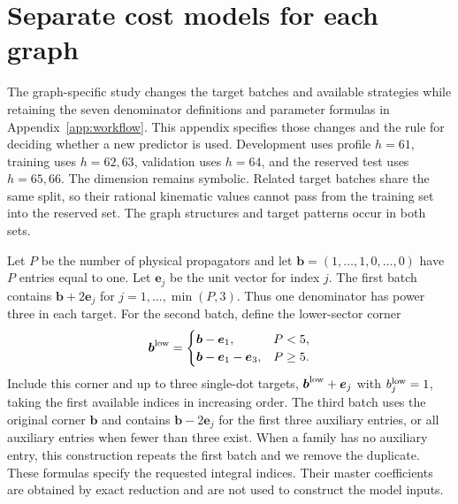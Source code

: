 \section{Separate cost models for each graph}
\label{app:type-specialists}
The graph-specific study changes the target batches and available strategies while retaining the seven denominator definitions and parameter formulas in Appendix~\ref{app:workflow}. This appendix specifies those changes and the rule for deciding whether a new predictor is used. Development uses profile $h=61$,
training uses $h=62,63$, validation uses $h=64$, and the reserved test uses
$h=65,66$. The dimension remains symbolic. Related target batches share
the same split, so their rational kinematic values cannot pass from the
training set into the reserved set. The graph structures and target
patterns occur in both sets.

Let $P$ be the number of physical propagators and let
$\boldsymbol b=(1,\ldots,1,0,\ldots,0)$ have $P$ entries equal to one.
Let $\boldsymbol e_j$ be the unit vector for index $j$. The first batch
contains $\boldsymbol b+2\boldsymbol e_j$ for
$j=1,\ldots,\min(P,3)$. Thus one denominator has power three in each target.
For the second batch, define the lower-sector corner
\begin{equation}
 \boldsymbol b^{\rm low}=
 \begin{cases}
 \boldsymbol b-\boldsymbol e_1,&P<5,\\
 \boldsymbol b-\boldsymbol e_1-\boldsymbol e_3,&P\geq5.
 \end{cases}
\end{equation}
Include this corner and up to three single-dot targets,
$\boldsymbol b^{\rm low}+\boldsymbol e_j$ with $b^{\rm low}_j=1$,
taking the first available indices in increasing order.
The third batch uses the original corner $\boldsymbol b$ and contains
$\boldsymbol b-2\boldsymbol e_j$ for the first three auxiliary entries,
or all auxiliary entries when fewer than three exist. When a family has no auxiliary entry, this construction
repeats the first batch and we remove the duplicate. These formulas specify the requested integral indices. Their master coefficients are obtained by exact reduction and are not used to construct the model inputs.

